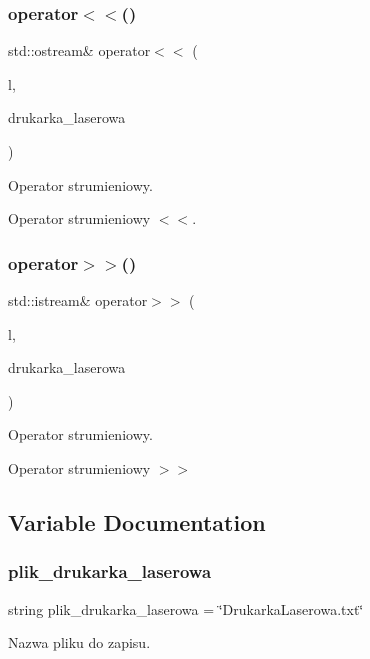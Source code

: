 \subsubsection{operator$<$$<$()}
{\footnotesize\ttfamily std\+::ostream\& operator$<$$<$ (\begin{DoxyParamCaption}\item[{std\+::ostream \&}]{l,  }\item[{\textbf{ Drukarka\+Laserowa} \&}]{drukarka\+\_\+laserowa }\end{DoxyParamCaption})}



Operator strumieniowy. 

Operator strumieniowy $<$$<$. \mbox{\label{_drukarka_laserowa_8cpp_adab561874dc824b55c9695dd73b4cdff}} 
\subsubsection{operator$>$$>$()}
{\footnotesize\ttfamily std\+::istream\& operator$>$$>$ (\begin{DoxyParamCaption}\item[{std\+::istream \&}]{l,  }\item[{\textbf{ Drukarka\+Laserowa} \&}]{drukarka\+\_\+laserowa }\end{DoxyParamCaption})}



Operator strumieniowy. 

Operator strumieniowy $>$$>$ 

\subsection{Variable Documentation}
\mbox{\label{_drukarka_laserowa_8cpp_a2cd3bbbdddd1f1085587c64acf2a27df}} 
\subsubsection{plik\+\_\+drukarka\+\_\+laserowa}
{\footnotesize\ttfamily string plik\+\_\+drukarka\+\_\+laserowa = \char`\"{}Drukarka\+Laserowa.\+txt\char`\"{}}



Nazwa pliku do zapisu. 

